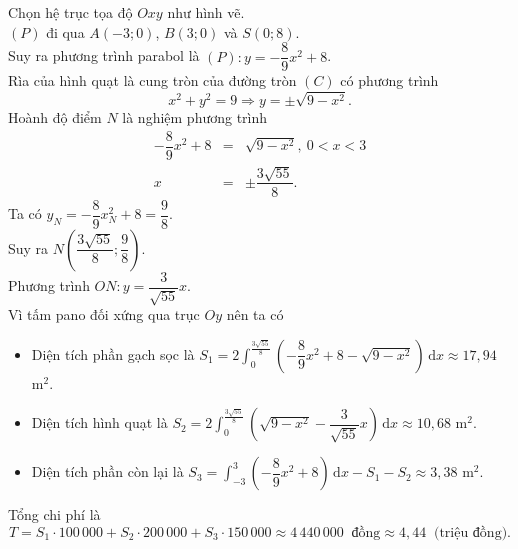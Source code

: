 \begin{bt}
{\begin{center}
		\end{center}
		Chọn hệ trục tọa độ $ Oxy $ như  hình vẽ.\\
		$(P)$ đi  qua $A(-3;0)$, $B(3;0)$ và $S(0;8)$.\\
		 Suy ra phương trình parabol là $(P)\colon y=-\dfrac{8}{9}x^2+8$.\\
		Rìa của hình quạt là cung tròn của đường  tròn $(C)$ có phương trình
		\[x^2+y^2=9\Rightarrow  y=\pm \sqrt{9-x^2}.\]
		Hoành độ điểm $N$ là nghiệm phương trình 
		\begin{eqnarray*}
			-\dfrac{8}{9}x^2+8&=&\sqrt{9-x^2},\ 0<x<3\\ 
			x&=&\pm \dfrac{3\sqrt{55}}{8}. 
		\end{eqnarray*}
		Ta có  $y_N=-\dfrac{8}{9}x_N^2+8=\dfrac{9}{8}$.\\
		 Suy ra $N\left(\dfrac{3\sqrt{55}}{8};\dfrac{9}{8}\right)$.\\
		Phương  trình $ON\colon y=\dfrac{3}{\sqrt{55}}x$.\\
		Vì tấm pano đối xứng qua trục $Oy$ nên  ta có
		\begin{itemize}
			\item  Diện tích phần gạch sọc là $ S_1=2\displaystyle\int_0^{\tfrac{3\sqrt{55}}{8}}\left(-\dfrac{8}{9}x^2+8-\sqrt{9-x^2}\right)\mathrm{\,d}x\approx 17{,}94$ m$^2$.
			\item Diện tích hình quạt là $ S_2=2\displaystyle\int_0^{\tfrac{3\sqrt{55}}{8}}\left(\sqrt{9-x^2}-\dfrac{3}{\sqrt{55}}x\right)\mathrm{\,d}x\approx  10{,}68$ m$^2$.
			 \item Diện tích phần còn lại là $ S_3=\displaystyle\int_{-3}^{3}\left(-\dfrac{8}{9}x^2+8\right)\mathrm{\,d}x-S_1-S_2\approx 3{,}38$ m$^2$.
		\end{itemize}
		Tổng chi phí  là
		\[T=S_1\cdot 100\,000+ S_2\cdot  200\,000+ S_3\cdot 150\,000\approx4\,440\,000\ \text{ đồng}\approx 4{,}44\ \text{ (triệu đồng)}.\]
	 }
\end{bt}

